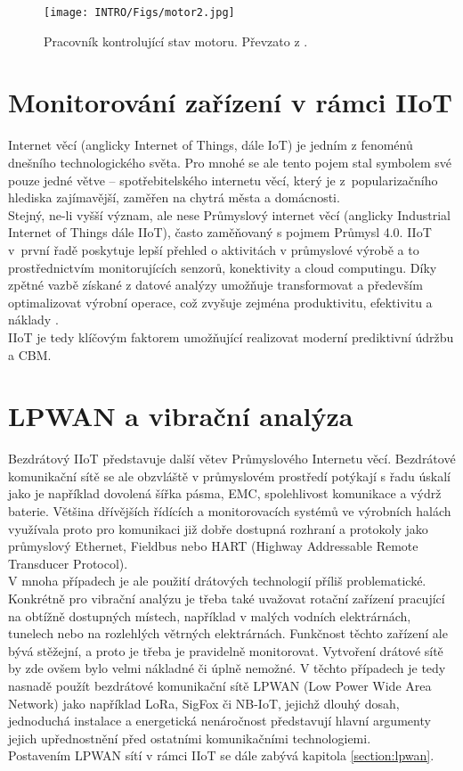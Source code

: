     \begin{figure} [!h]
        \centering
        \caption{Pracovník kontrolující stav motoru. Převzato z \cite{website:2}.}
            \texttt{[image: INTRO/Figs/motor2.jpg]}
    \end{figure} 
    
    

\section{Monitorování zařízení v rámci IIoT}
    Internet věcí (anglicky  Internet of Things, dále IoT) je jedním z fenoménů dnešního technologického světa. Pro mnohé se ale tento pojem stal symbolem své pouze jedné větve – spotřebitelského internetu věcí, který je z~popularizačního hlediska zajímavější, zaměřen na chytrá města a domácnosti.\\
    Stejný, ne-li vyšší význam, ale nese Průmyslový internet věcí (anglicky Industrial Internet of Things dále IIoT), často zaměňovaný s pojmem Průmysl 4.0. IIoT v~první řadě poskytuje lepší přehled o aktivitách v průmyslové výrobě a to prostřednictvím monitorujících senzorů, konektivity a cloud computingu.
     Díky zpětné vazbě získané z datové analýzy umožňuje transformovat a především optimalizovat výrobní operace, což zvyšuje zejména produktivitu, efektivitu a náklady \cite{article:1}.\\
     IIoT je tedy klíčovým faktorem umožňující realizovat moderní prediktivní údržbu a CBM.
    
    

\section{LPWAN a vibrační analýza}
    
    Bezdrátový IIoT představuje další větev Průmyslového Internetu věcí. Bezdrátové komunikační sítě se ale obzvláště v průmyslovém prostředí potýkají s řadu úskalí jako je například dovolená šířka pásma, EMC, spolehlivost komunikace a výdrž baterie. Většina dřívějších řídících a monitorovacích systémů ve výrobních halách využívala proto pro komunikaci již dobře dostupná rozhraní a protokoly jako průmyslový Ethernet, Fieldbus nebo HART (Highway Addressable Remote Transducer Protocol).\\
    V mnoha případech je ale použití drátových technologií příliš problematické. Konkrétně pro vibrační analýzu je třeba také uvažovat rotační zařízení pracující na obtížně dostupných místech, například v malých vodních elektrárnách, tunelech nebo na rozlehlých větrných elektrárnách. Funkčnost těchto zařízení ale bývá stěžejní, a proto je třeba je pravidelně monitorovat. Vytvoření drátové sítě by zde ovšem bylo velmi nákladné či úplně nemožné. V těchto případech je tedy nasnadě použít bezdrátové komunikační sítě LPWAN (Low Power Wide Area Network) jako například LoRa, SigFox či NB-IoT, jejichž dlouhý dosah, jednoduchá instalace a energetická nenáročnost představují hlavní argumenty jejich upřednostnění před ostatními komunikačními technologiemi.\\
    Postavením LPWAN sítí v rámci IIoT se dále zabývá kapitola \ref{section:lpwan}.
    
